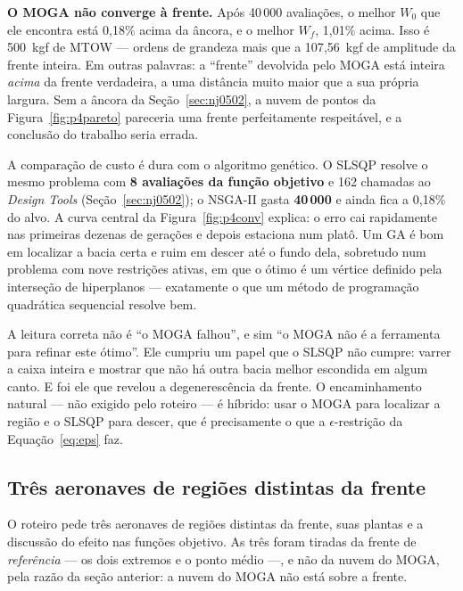 \textbf{O MOGA não converge à frente.} Após 40\,000 avaliações, o
melhor $W_0$ que ele encontra está 0{,}18\% acima da âncora, e o
melhor $W_f$, 1{,}01\% acima. Isso é
500~kgf de MTOW --- ordens de grandeza mais que a
107{,}56~kgf de amplitude da frente inteira. Em outras palavras: a
``frente'' devolvida pelo MOGA está inteira \emph{acima} da frente
verdadeira, a uma distância muito maior que a sua própria largura. Sem a
âncora da Seção~\ref{sec:nj0502}, a nuvem de pontos da
Figura~\ref{fig:p4pareto} pareceria uma frente perfeitamente
respeitável, e a conclusão do trabalho seria errada.

A comparação de custo é dura com o algoritmo genético. O SLSQP resolve o
mesmo problema com \textbf{8 avaliações da função objetivo} e 162
chamadas ao \emph{Design Tools} (Seção~\ref{sec:nj0502}); o NSGA-II gasta
\textbf{40\,000} e ainda fica a 0{,}18\% do alvo. A curva central
da Figura~\ref{fig:p4conv} explica: o erro cai rapidamente nas primeiras
dezenas de gerações e depois estaciona num platô. Um GA é bom em
localizar a bacia certa e ruim em descer até o fundo dela, sobretudo num
problema com nove restrições ativas, em que o ótimo é um vértice
definido pela interseção de hiperplanos --- exatamente o que um método de
programação quadrática sequencial resolve bem.

A leitura correta não é ``o MOGA falhou'', e sim ``o MOGA não é a
ferramenta para refinar este ótimo''. Ele cumpriu um papel que o SLSQP
não cumpre: varrer a caixa inteira e mostrar que não há outra bacia
melhor escondida em algum canto. E foi ele que revelou a degenerescência
da frente. O encaminhamento natural --- não exigido pelo roteiro --- é
híbrido: usar o MOGA para localizar a região e o SLSQP para descer,
que é precisamente o que a $\epsilon$-restrição da
Equação~\eqref{eq:eps} faz.

\subsection{Três aeronaves de regiões distintas da frente}
\label{sec:p4tres}

O roteiro pede três aeronaves de regiões distintas da frente, suas
plantas e a discussão do efeito nas funções objetivo. As três foram
tiradas da frente de \emph{referência} --- os dois extremos e o ponto
médio ---, e não da nuvem do MOGA, pela razão da seção anterior: a nuvem
do MOGA não está sobre a frente.

